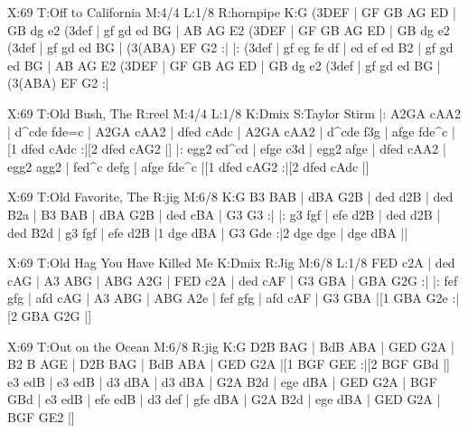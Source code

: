 \documentclass{article}
\begin{document}
\begin{abc}[name]
X:69
T:Off to California
M:4/4
L:1/8
R:hornpipe
K:G
(3DEF | GF GB AG ED | GB dg e2 (3def | gf gd ed BG | AB AG E2 (3DEF |
GF GB AG ED | GB dg e2 (3def | gf gd ed BG | (3(ABA) EF G2 :|
|: (3def | gf eg fe df | ed ef ed B2 | gf gd ed BG | AB AG E2 (3DEF |
GF GB AG ED | GB dg e2 (3def | gf gd ed BG | (3(ABA) EF G2 :|
\end{abc}

\begin{abc}[name]
X:69
T:Old Bush, The
R:reel
M:4/4
L:1/8
K:Dmix
S:Taylor Stirm
|: A2GA cAA2 | d^cde fde=c | A2GA cAA2 | dfed cAdc |
A2GA cAA2 | d^cde f3g | afge fde^c |[1 dfed cAdc :|[2 dfed cAG2 |]
|: egg2 ed^cd | efge c3d | egg2 afge | dfed cAA2 |
egg2 agg2 | fed^c defg | afge fde^c |[1 dfed cAG2 :|[2 dfed cAdc |]
\end{abc}

\begin{abc}[name]
X:69
T:Old Favorite, The
R:jig
M:6/8
K:G
B3 BAB | dBA G2B | ded d2B | ded B2a |
B3 BAB | dBA G2B | ded cBA | G3 G3 :|
|: g3 fgf | efe d2B | ded d2B | ded B2d |
g3 fgf | efe d2B |1 dge dBA | G3 Gde :|2 dge dge | dge dBA ||
\end{abc}

\begin{abc}[name]
X:69
T:Old Hag You Have Killed Me
K:Dmix
R:Jig
M:6/8
L:1/8
FED c2A | ded cAG | A3 ABG | ABG A2G |
FED c2A | ded cAF | G3 GBA | GBA G2G :|
|: fef gfg | afd cAG | A3 ABG | ABG A2e |
fef gfg | afd cAF | G3 GBA |[1 GBA G2e :|[2 GBA G2G |]
\end{abc}

\begin{abc}[name]
X:69
T:Out on the Ocean
M:6/8
R:jig
K:G
D2B BAG | BdB ABA | GED G2A | B2 B AGE |
D2B BAG | BdB ABA | GED G2A |[1 BGF GEE :|[2 BGF GBd |]
e3 edB | e3 edB | d3 dBA | d3 dBA |
G2A B2d | ege dBA | GED G2A | BGF GBd |
e3 edB | efe edB | d3 def | gfe dBA |
G2A B2d | ege dBA | GED G2A | BGF GE2 |]
\end{abc}
\end{document}
